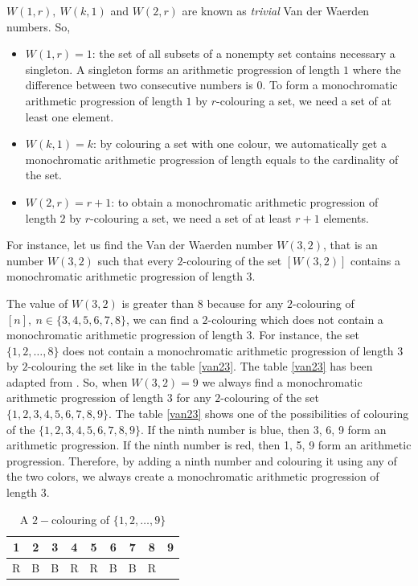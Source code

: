 $W(1,r), \ W(k,1)$ and $W(2,r)$ are known as \textit{trivial} Van der Waerden numbers. So, 
\begin{itemize}
\item $W(1,r)=1$:  the set of all subsets of a nonempty set contains necessary a singleton. A singleton forms an arithmetic progression of length $1$ where the difference between two consecutive numbers is $0.$ To form a monochromatic arithmetic progression of length $1$ by $r$-colouring a set, we need  a set of at least one element. 
\item $W(k,1)=k$: by colouring a set with one colour, we automatically get a monochromatic arithmetic progression of length equals to the cardinality  of the set.
\item $W(2,r)=r+1$: to obtain a monochromatic arithmetic progression of length $2$ by $r$-colouring a set, we need a set of at least $r+1$ elements.
\end{itemize}

For instance, let us find the Van der Waerden number $W(3,2)$, that is an number $W(3,2)$ such that every $2$-colouring  of the set $[W(3,2)]$ contains a monochromatic arithmetic progression of length $3.$

The value of $W(3,2)$ is greater than $8$ because for any $2$-colouring of $[n],\ n\in \{3,4,5,6,7,8\}$, we can find a $2$-colouring which does not contain a monochromatic arithmetic progression of length 3. For instance, the set  $\{1,2,\ldots, 8\}$ does not contain a monochromatic  arithmetic progression of length $3$ by $2$-colouring the set  like in the table \eqref{van23}. The table \eqref{van23} has been adapted from  \cite{wiki:Van_der_Waerden's_theorem}.
So, when $W(3,2)=9$ we always find a monochromatic arithmetic progression of length 3 for any $2$-colouring of the set  $\{1,2,3,4,5,6,7,8,9\}.$ The table \eqref{van23} shows one of the possibilities of colouring of the  $\{1,2,3,4,5,6,7,8,9\}.$  If the ninth number is {\color{blue} blue}, then{ \color{blue}3, 6, 9}  form an arithmetic progression. If the ninth number is {\color{red} red}, then {\color{red}1, 5, 9} form an arithmetic progression. Therefore, by adding a ninth number and colouring it using any of the two colors, we always create  a monochromatic arithmetic progression of length 3.

\begin{table}[h]
\begin{center}
\begin{tabular}{ccccccccc}
\hline
1 & 2 & 3 & 4  & 5 & 6 & 7 & 8 & 9 \\ \hline
\color{red}R & \color{blue}B & \color{blue}B & \color{red}R & \color{red}R & \color{blue}B & \color{blue}B & \color{red}R  & \\
\hline 
\end{tabular} 
\end{center}
\caption{A $2-$colouring of $\{1,2,\ldots, 9\}$}
  \label{van23}
\end{table}

